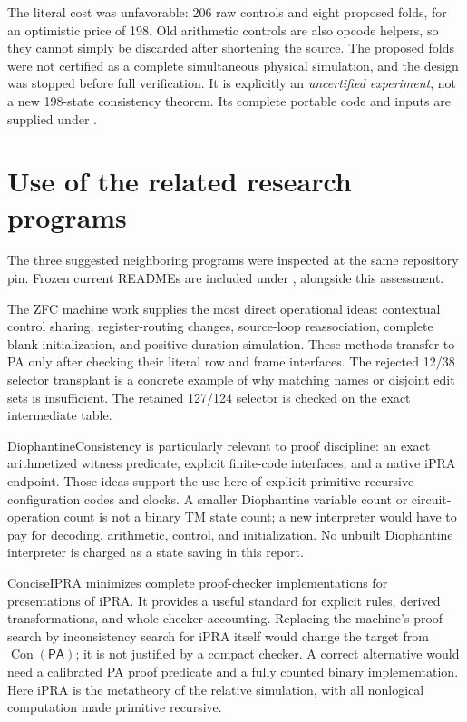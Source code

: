 \documentclass[11pt,letterpaper]{article}
\newcommand{\PA}{\mathsf{PA}}
\newcommand{\Con}{\operatorname{Con}}
\newcommand{\file}[1]{\path{#1}}
\begin{document}
The literal cost was unfavorable: 206 raw controls and eight proposed
folds, for an optimistic price of 198. Old arithmetic controls are also
opcode helpers, so they cannot simply be discarded after shortening the
source. The proposed folds were not certified as a complete simultaneous
physical simulation, and the design was stopped before full verification.
It is explicitly an \emph{uncertified experiment}, not a new 198-state
consistency theorem. Its complete portable code and inputs are supplied
under \file{research/theory/}.

\section{Use of the related research programs}

The three suggested neighboring programs were inspected at the same
repository pin.\cite{zfc,related} Frozen current READMEs are included under
\file{research/related_projects/}, alongside this assessment.

The ZFC machine work supplies the most direct operational ideas:
contextual control sharing, register-routing changes, source-loop
reassociation, complete blank initialization, and positive-duration
simulation. These methods transfer to PA only after checking their
literal row and frame interfaces. The rejected 12/38 selector transplant
is a concrete example of why matching names or disjoint edit sets is
insufficient. The retained 127/124 selector is checked on the exact
intermediate table.

DiophantineConsistency is particularly relevant to proof discipline:
an exact arithmetized witness predicate, explicit finite-code interfaces,
and a native iPRA endpoint. Those ideas support the use here of explicit
primitive-recursive configuration codes and clocks. A smaller Diophantine
variable count or circuit-operation count is not a binary TM state
count; a new interpreter would have to pay for decoding, arithmetic,
control, and initialization. No unbuilt Diophantine interpreter is charged
as a state saving in this report.

ConciseIPRA minimizes complete proof-checker implementations for
presentations of iPRA. It provides a useful standard for explicit rules,
derived transformations, and whole-checker accounting. Replacing the
machine's proof search by inconsistency search for iPRA itself would
change the target from $\Con(\PA)$; it is not justified by a compact
checker. A correct alternative would need a calibrated PA proof
predicate and a fully counted binary implementation. Here iPRA is the
metatheory of the relative simulation, with all nonlogical computation
made primitive recursive.
\end{document}
